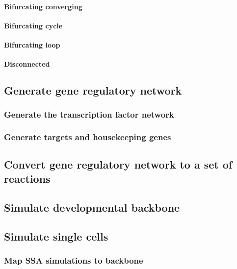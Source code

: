\paragraph{Bifurcating converging}
\paragraph{Bifurcating cycle}
\paragraph{Bifurcating loop}
\paragraph{Disconnected}


\subsection{Generate gene regulatory network}
\blindtext
\subsubsection{Generate the transcription factor network}
\blindtext
\subsubsection{Generate targets and housekeeping genes}
\blindtext

\subsection{Convert gene regulatory network to a set of reactions}
\blindtext

\subsection{Simulate developmental backbone} \label{sec:dyngen_sim_backbone}
\blindtext

\subsection{Simulate single cells} \label{sec:dyngen_ssa}
\blindtext

\subsubsection{Map SSA simulations to backbone}
\blindtext

